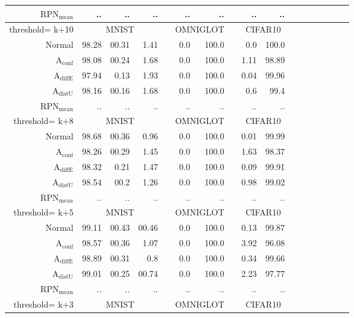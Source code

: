 \begin{table}[ht]
\begin{tiny}
\begin{tabular}{@{}rrrrrrrcrrrrcrrrr@{}}
		$\mathrm{RPN}_{\mathrm{mean}}$ & .. & .. & .. & & .. & .. & & .. & .. \\
		\midrule
		threshold= k+10 & \multicolumn{3}{c}{MNIST} & & \multicolumn{2}{c}{OMNIGLOT} & & \multicolumn{2}{c}{CIFAR10} \\
		Normal & 98.28 & 00.31 & 1.41 & & 0.0 & 100.0 && 0.0 & 100.0 \\
		$\mathrm{A}_{\mathrm{conf}}$ & 98.08 & 00.24 & 1.68 && 0.0 & 100.0 && 1.11 & 98.89 \\
		$\mathrm{A}_{\mathrm{diffE}}$ & 97.94 & 0.13 & 1.93 & & 0.0 & 100.0 & & 0.04 & 99.96 \\  
		$\mathrm{A}_{\mathrm{distU}}$ & 98.16 & 00.16 & 1.68 & & 0.0 & 100.0 & & 0.6 & 99.4 \\
		$\mathrm{RPN}_{\mathrm{mean}}$ & .. & .. & .. & & .. & .. & & .. & .. \\
		\midrule
		threshold= k+8 & \multicolumn{3}{c}{MNIST} & & \multicolumn{2}{c}{OMNIGLOT} & & \multicolumn{2}{c}{CIFAR10} \\
		Normal & 98.68 & 00.36 & 0.96 & & 0.0 & 100.0 && 0.01 & 99.99 \\
		$\mathrm{A}_{\mathrm{conf}}$ & 98.26 & 00.29 & 1.45 && 0.0 & 100.0 && 1.63 & 98.37 \\
		$\mathrm{A}_{\mathrm{diffE}}$ & 98.32 & 0.21 & 1.47 & & 0.0 & 100.0 & & 0.09 & 99.91 \\  
		$\mathrm{A}_{\mathrm{distU}}$ & 98.54 & 00.2 & 1.26 & & 0.0 & 100.0 & & 0.98 & 99.02 \\
		$\mathrm{RPN}_{\mathrm{mean}}$ & .. & .. & .. & & .. & .. & & .. & .. \\
		\midrule
		threshold= k+5 & \multicolumn{3}{c}{MNIST} & & \multicolumn{2}{c}{OMNIGLOT} & & \multicolumn{2}{c}{CIFAR10} \\
		Normal & 99.11 & 00.43 & 00.46 & & 0.0 & 100.0 && 0.13 & 99.87 \\
		$\mathrm{A}_{\mathrm{conf}}$ & 98.57 & 00.36 & 1.07 && 0.0 & 100.0 && 3.92 & 96.08 \\
		$\mathrm{A}_{\mathrm{diffE}}$ & 98.89 & 00.31 & 0.8 & & 0.0 & 100.0 & & 0.34 & 99.66 \\  
		$\mathrm{A}_{\mathrm{distU}}$ & 99.01 & 00.25 & 00.74 & & 0.0 & 100.0 & & 2.23 & 97.77 \\
		$\mathrm{RPN}_{\mathrm{mean}}$ & .. & .. & .. & & .. & .. & & .. & .. \\
		\midrule
		threshold= k+3 & \multicolumn{3}{c}{MNIST} & & \multicolumn{2}{c}{OMNIGLOT} & & \multicolumn{2}{c}{CIFAR10} \\

\end{tabular}
\end{tiny}
\end{table}
